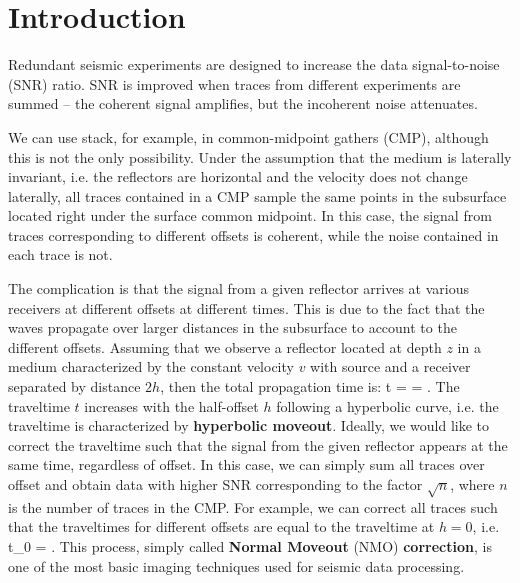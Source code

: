 \section{Introduction}

Redundant seismic experiments are designed to increase the data
signal-to-noise (SNR) ratio. SNR is improved when traces from
different experiments are summed -- the coherent signal amplifies, but
the incoherent noise attenuates. 

We can use stack, for example, in common-midpoint gathers (CMP),
although this is not the only possibility. Under the assumption that
the medium is laterally invariant, i.e. the reflectors are horizontal
and the velocity does not change laterally, all traces contained in a
CMP sample the same points in the subsurface located right under the
surface common midpoint. In this case, the signal from traces
corresponding to different offsets is coherent, while the noise
contained in each trace is not.


The complication is that the signal from a given reflector arrives at
various receivers at different offsets at different times. This is due
to the fact that the waves propagate over larger distances in the
subsurface to account to the different offsets. Assuming that we
observe a reflector located at depth $z$ in a medium characterized by
the constant velocity $v$ with source and a receiver separated by
distance $2h$, then the total propagation time is:
%
\beq
t =  =  \;.
\eeq
%
The traveltime $t$ increases with the half-offset $h$ following a
hyperbolic curve, i.e. the traveltime is characterized by
\textbf{hyperbolic moveout}. Ideally, we would like to correct the
traveltime such that the signal from the given reflector appears at
the same time, regardless of offset. In this case, we can simply sum
all traces over offset and obtain data with higher SNR corresponding
to the factor $\sqrt{n}$, where $n$ is the number of traces in the
CMP. For example, we can correct all traces such that the traveltimes
for different offsets are equal to the traveltime at $h=0$, i.e.
%
\beq
t_0 = \;.
\eeq
% 
This process, simply called \textbf{Normal Moveout} (NMO)
\textbf{correction}, is one of the most basic imaging techniques used
for seismic data processing.

